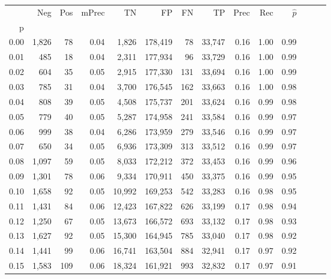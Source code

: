 \begin{tabular}{rrrrrrrrrrrrrr}
\toprule
{} &    Neg &  Pos & mPrec &       TN &       FP &      FN &      TP &  Prec &   Rec & $\hat{p}$ \\
p    &        &      &       &          &          &         &         &       &       &           \\
\midrule
0.00 &  1,826 &   78 &  0.04 &    1,826 &  178,419 &      78 &  33,747 &  0.16 &  1.00 &      0.99 \\
0.01 &    485 &   18 &  0.04 &    2,311 &  177,934 &      96 &  33,729 &  0.16 &  1.00 &      0.99 \\
0.02 &    604 &   35 &  0.05 &    2,915 &  177,330 &     131 &  33,694 &  0.16 &  1.00 &      0.99 \\
0.03 &    785 &   31 &  0.04 &    3,700 &  176,545 &     162 &  33,663 &  0.16 &  1.00 &      0.98 \\
0.04 &    808 &   39 &  0.05 &    4,508 &  175,737 &     201 &  33,624 &  0.16 &  0.99 &      0.98 \\
0.05 &    779 &   40 &  0.05 &    5,287 &  174,958 &     241 &  33,584 &  0.16 &  0.99 &      0.97 \\
0.06 &    999 &   38 &  0.04 &    6,286 &  173,959 &     279 &  33,546 &  0.16 &  0.99 &      0.97 \\
0.07 &    650 &   34 &  0.05 &    6,936 &  173,309 &     313 &  33,512 &  0.16 &  0.99 &      0.97 \\
0.08 &  1,097 &   59 &  0.05 &    8,033 &  172,212 &     372 &  33,453 &  0.16 &  0.99 &      0.96 \\
0.09 &  1,301 &   78 &  0.06 &    9,334 &  170,911 &     450 &  33,375 &  0.16 &  0.99 &      0.95 \\
0.10 &  1,658 &   92 &  0.05 &   10,992 &  169,253 &     542 &  33,283 &  0.16 &  0.98 &      0.95 \\
0.11 &  1,431 &   84 &  0.06 &   12,423 &  167,822 &     626 &  33,199 &  0.17 &  0.98 &      0.94 \\
0.12 &  1,250 &   67 &  0.05 &   13,673 &  166,572 &     693 &  33,132 &  0.17 &  0.98 &      0.93 \\
0.13 &  1,627 &   92 &  0.05 &   15,300 &  164,945 &     785 &  33,040 &  0.17 &  0.98 &      0.92 \\
0.14 &  1,441 &   99 &  0.06 &   16,741 &  163,504 &     884 &  32,941 &  0.17 &  0.97 &      0.92 \\
0.15 &  1,583 &  109 &  0.06 &   18,324 &  161,921 &     993 &  32,832 &  0.17 &  0.97 &      0.91 \\

\end{tabular}
